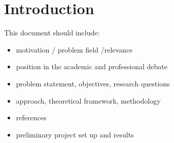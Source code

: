 
\chapter{Introduction}
\label{chap:introduction}

This document should include:
\begin{itemize} 
\item motivation / problem field /relevance

\item position in the academic and professional debate

\item problem statement, objectives, research questions

\item approach, theoretical framework, methodology

\item references

\item preliminary project set up and results

\end{itemize}


